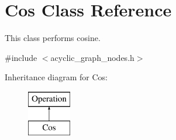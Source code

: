 \hypertarget{classCos}{}\section{Cos Class Reference}
\label{classCos}


This class performs cosine.  




{\ttfamily \#include $<$acyclic\+\_\+graph\+\_\+nodes.\+h$>$}

Inheritance diagram for Cos\+:\begin{figure}[H]
\begin{center}
\leavevmode
\includegraphics[height=2.000000cm]{classCos}
\end{center}
\end{figure}
